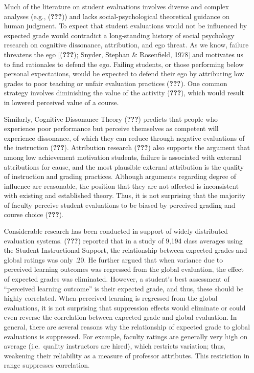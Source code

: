 \documentclass[man]{apa6}
\theoremstyle{definition}
\theoremstyle{definition}
\theoremstyle{definition}
\theoremstyle{remark}
\begin{document}
Much of the literature on student evaluations involves diverse and
complex analyses (e.g., ({\textbf{???}})) and lacks social-psychological
theoretical guidance on human judgment. To expect that student
evaluations would not be influenced by expected grade would contradict a
long-standing history of social psychology research on cognitive
dissonance, attribution, and ego threat. As we know, failure threatens
the ego {[}({\textbf{???}}); Snyder, Stephan \& Rosenfield, 1978{]} and
motivates us to find rationales to defend the ego. Failing students, or
those performing below personal expectations, would be expected to
defend their ego by attributing low grades to poor teaching or unfair
evaluation practices ({\textbf{???}}). One common strategy involves
diminishing the value of the activity ({\textbf{???}}), which would
result in lowered perceived value of a course.

Similarly, Cognitive Dissonance Theory ({\textbf{???}}) predicts that
people who experience poor performance but perceive themselves as
competent will experience dissonance, of which they can reduce through
negative evaluations of the instruction ({\textbf{???}}). Attribution
research ({\textbf{???}}) also supports the argument that among low
achievement motivation students, failure is associated with external
attributions for cause, and the most plausible external attribution is
the quality of instruction and grading practices. Although arguments
regarding degree of influence are reasonable, the position that they are
not affected is inconsistent with existing and established theory. Thus,
it is not surprising that the majority of faculty perceive student
evaluations to be biased by perceived grading and course choice
({\textbf{???}}).

Considerable research has been conducted in support of widely
distributed evaluation systems. ({\textbf{???}}) reported that in a
study of 9,194 class averages using the Student Instructional Support,
the relationship between expected grades and global ratings was only
.20. He further argued that when variance due to perceived learning
outcomes was regressed from the global evaluation, the effect of
expected grades was eliminated. However, a student's best assessment of
\enquote{perceived learning outcome} is their expected grade, and thus,
these should be highly correlated. When perceived learning is regressed
from the global evaluations, it is not surprising that suppression
effects would eliminate or could even reverse the correlation between
expected grade and global evaluation. In general, there are several
reasons why the relationship of expected grade to global evaluations is
suppressed. For example, faculty ratings are generally very high on
average (i.e.~quality instructors are hired), which restricts variation;
thus, weakening their reliability as a measure of professor attributes.
This restriction in range suppresses correlation.
\end{document}
